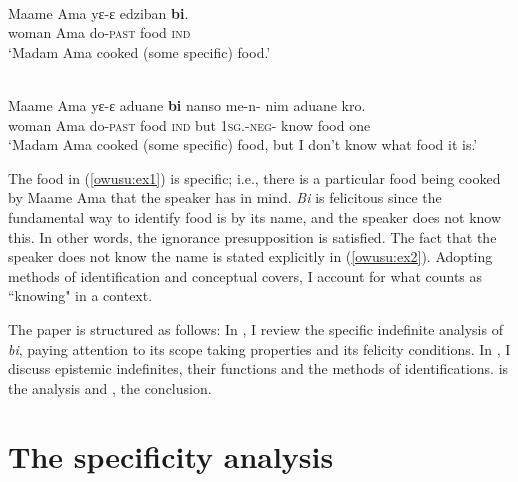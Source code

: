 \documentclass[output=paper,modfonts,nonflat,draftmode]{langsci/langscibook}
\begin{document}
\ea 
{}\\
\ea\label{owusu:ex1}

\gll Maame Ama yε-ε edziban \textbf{bi}. \\
     woman Ama do-\textsc{past} food  \textsc{ind}   \\
\glt `Madam Ama cooked (some specific) food.'

\ex\label{owusu:ex2}
\\
\gll  Maame Ama yε-ε aduane \textbf{bi} nanso me-n- nim aduane kro. \\
     woman Ama do-\textsc{past} food  \textsc{ind} but \textsc{1sg.}-\textsc{neg}- know food one \\ 
     \glt `Madam Ama cooked (some specific) food, but I don't know what food it is.'
     
\z \z 

The food in (\ref{owusu:ex1}) is specific; i.e., there is a particular food being cooked by Maame Ama that the speaker has in mind. \emph{Bi} is felicitous since the fundamental way to identify food is by its name, and the speaker does not know this. In other words, the ignorance presupposition is satisfied. The fact that the speaker does not know the name is stated explicitly in (\ref{owusu:ex2}). Adopting \citet{AloniPort2015} methods of identification and conceptual covers, I account for what counts as ``knowing" in a context.

The paper is structured as follows: In , I review the specific indefinite analysis of \emph{bi}, paying attention to its scope taking properties and its felicity conditions. In , I discuss epistemic indefinites, their functions and the methods of identifications.   is the analysis and , the conclusion.  


\section{The specificity analysis}\label{sec:owusu:2}
 
\end{document}
